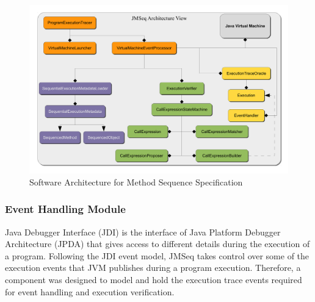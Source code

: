 \begin{figure}[t]
\begin{center}
  \includegraphics[scale=0.35]{images/arch-diagram}
  \caption{Software Architecture for Method Sequence Specification}
  \label{ch05:fig:arch-diag}
\end{center}
\end{figure}


\subsubsection{Event Handling Module} \label{ch05:sec:event_handling}
Java Debugger Interface (JDI) is the interface
of Java Platform Debugger Architecture (JPDA) that gives access to different details during the execution of a program.
Following the JDI event model, JMSeq takes control over some of the
execution events that JVM publishes during a program execution. Therefore, a
component was designed to model and hold the execution trace events required
for event handling and execution verification.

